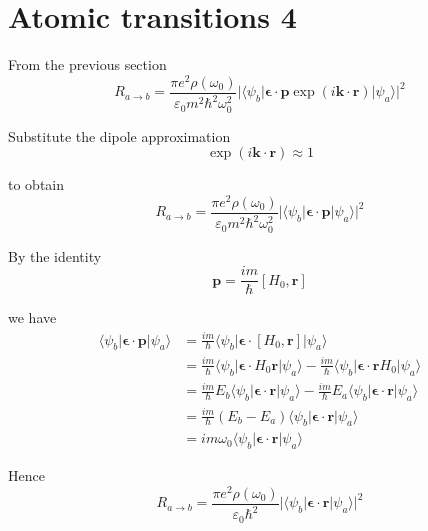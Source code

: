 

\section*{Atomic transitions 4}

From the previous section
\begin{equation*}
R_{a\rightarrow b}
=\frac{\pi e^2\rho(\omega_0)}{\varepsilon_0m^2\hbar^2\omega_0^2}
\bigl|\langle\psi_b|\boldsymbol{\epsilon}\cdot\mathbf p\exp(i\mathbf k\cdot\mathbf r)|\psi_a\rangle\bigr|^2
\end{equation*}

Substitute the dipole approximation
\begin{equation*}
\exp(i\mathbf k\cdot\mathbf r)\approx1
\end{equation*}

to obtain
\begin{equation*}
R_{a\rightarrow b}
=\frac{\pi e^2\rho(\omega_0)}{\varepsilon_0m^2\hbar^2\omega_0^2}
\bigl|\langle\psi_b|\boldsymbol{\epsilon}\cdot\mathbf p|\psi_a\rangle\bigr|^2
\end{equation*}

By the identity
\begin{equation*}
\mathbf p=\frac{im}{\hbar}[H_0,\mathbf r]
\tag{1}
\end{equation*}

we have
\begin{align*}
\langle\psi_b|\boldsymbol{\epsilon}\cdot\mathbf p|\psi_a\rangle
&=\frac{im}{\hbar}\langle\psi_b|\boldsymbol{\epsilon}\cdot[H_0,\mathbf r]|\psi_a\rangle
\\
&=\frac{im}{\hbar}\langle\psi_b|\boldsymbol{\epsilon}\cdot H_0\mathbf r|\psi_a\rangle
-\frac{im}{\hbar}\langle\psi_b|\boldsymbol{\epsilon}\cdot\mathbf rH_0|\psi_a\rangle
\\
&=\frac{im}{\hbar}E_b\langle\psi_b|\boldsymbol{\epsilon}\cdot\mathbf r|\psi_a\rangle
-\frac{im}{\hbar}E_a\langle\psi_b|\boldsymbol{\epsilon}\cdot\mathbf r|\psi_a\rangle
\\
&=\frac{im}{\hbar}(E_b-E_a)\langle\psi_b|\boldsymbol{\epsilon}\cdot\mathbf r|\psi_a\rangle
\\
&=im\omega_0\langle\psi_b|\boldsymbol{\epsilon}\cdot\mathbf r|\psi_a\rangle
\end{align*}

Hence
\begin{equation*}
R_{a\rightarrow b}
=\frac{\pi e^2\rho(\omega_0)}{\varepsilon_0\hbar^2}
\bigl|\langle\psi_b|\boldsymbol{\epsilon}\cdot\mathbf r|\psi_a\rangle\bigr|^2
\end{equation*}

